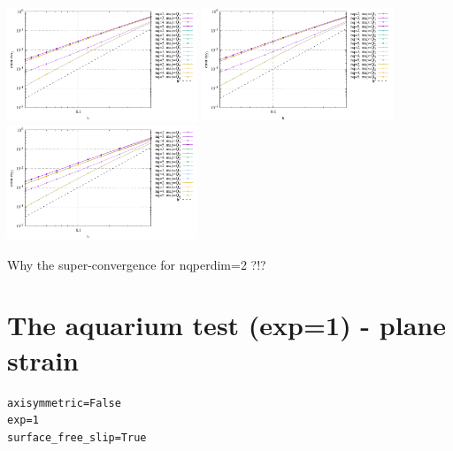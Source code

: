 \begin{center}
\includegraphics[width=5.7cm]{python_codes/fieldstone_152/results/exp0/err_exx3}
\includegraphics[width=5.7cm]{python_codes/fieldstone_152/results/exp0/err_eyy3}
\includegraphics[width=5.7cm]{python_codes/fieldstone_152/results/exp0/err_exy3}
\end{center}

Why the super-convergence for nqperdim=2 ?!?



\newpage
\section*{The aquarium test (exp=1) - plane strain}

\begin{lstlisting}
axisymmetric=False
exp=1
surface_free_slip=True
\end{lstlisting}

